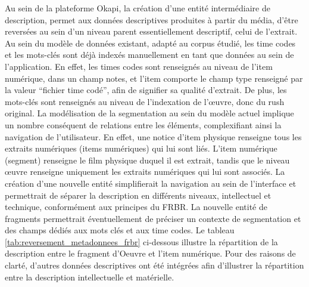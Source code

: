 Au sein de la plateforme Okapi, la création d'une entité intermédiaire de description, permet aux données descriptives produites à partir du média, d'être reversées au sein d'un niveau parent essentiellement descriptif, celui de l'extrait. Au sein du modèle de données existant, adapté au corpus étudié, les time codes et les mots-clés sont déjà indexés manuellement en tant que données au sein de l’application. En effet, les times codes sont renseignés au niveau de l'item numérique, dans un champ notes, et l'item comporte le champ type renseigné par la valeur “fichier time codé”, afin de signifier sa qualité d'extrait. De plus, les mots-clés sont renseignés au niveau de l’indexation de l’œuvre, donc du rush original. La modélisation de la segmentation au sein du modèle actuel implique un nombre conséquent de relations entre les éléments, complexifiant ainsi la navigation de l'utilisateur. En effet, une notice d'item physique renseigne tous les extraits numériques (items numériques) qui lui sont liés. L’item numérique (segment) renseigne le film physique duquel il est extrait, tandis que le niveau œuvre renseigne uniquement les extraits numériques qui lui sont associés. 
La création d’une nouvelle entité simplifierait la navigation au sein de l'interface et permettrait de séparer la description en différents niveaux, intellectuel et technique, conformément aux principes du FRBR. La nouvelle entité de fragments permettrait éventuellement de préciser un contexte de segmentation et des champs dédiés aux mots clés et aux time codes. Le tableau \ref{tab:reversement_metadonnees_frbr} ci-dessous illustre la répartition de la description entre le fragment d'Oeuvre et l'item numérique. Pour des raisons de clarté, d'autres données descriptives ont été intégrées afin d'illustrer la répartition entre la description intellectuelle et matérielle. 

